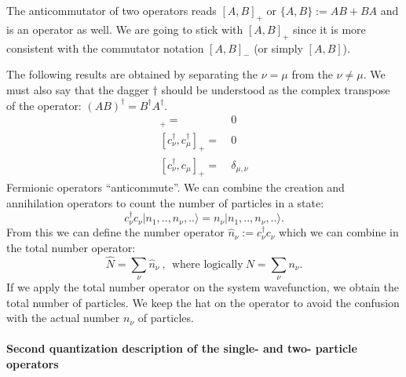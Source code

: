 \documentclass[../main.tex]{subfile}
\begin{document}
The anticommutator of two operators reads $[A,B]_{+}$ or $\{A,B\} := AB + BA$ and is an operator as well.
We are going to stick with $[A,B]_{+}$ since it is more consistent with the commutator notation $[A,B]_{-}$ (or simply $[A,B]$).

The following results are obtained by separating the $\nu = \mu$ from the $\nu \neq \mu$. We must also say that the dagger $\dagger$ 
should be understood as the complex transpose of the operator: $(AB)^{\dagger} = B^{\dagger}A^{\dagger}$.
\begin{align}
    [c_{\nu},c_{\mu}]_+ =&~ 0 \label{eq:Fermion1} \\
    [c^{\dagger}_{\nu},c^{\dagger}_{\mu}]_+ =&~0 \label{eq:Fermion2} \\
    [c^{\dagger}_{\nu},c_{\mu}]_+ =&~ \delta_{\mu,\nu}\label{eq:Fermion3} 
\end{align} 
Fermionic operators ``anticommute''.
We can combine the creation and annihilation operators to count the number of particles in a state:
\[
    c_{\nu}^{\dagger} c_{\nu} |n_{1},..,n_{\nu},..\rangle = n_{\nu}|n_{1},..,n_{\nu},..\rangle.
\]  
From this we can define the number operator $\hat{n}_{\nu}:= c_{\nu}^{\dagger} c_{\nu}$ which we can combine in the total number operator:
\[
    \hat{N} = \sum_{\nu} \hat{n}_{\nu}~,~~\text{where logically}~ N = \sum_{\nu} n_{\nu}.
\]
If we apply the total number operator on the system wavefunction, we obtain the total number of particles.
We keep the hat on the operator to avoid the confusion with the actual number $n_{\nu}$ of particles.\\

\paragraph{Second quantization description of the single- and two- particle operators}$~$\\
\end{document}
